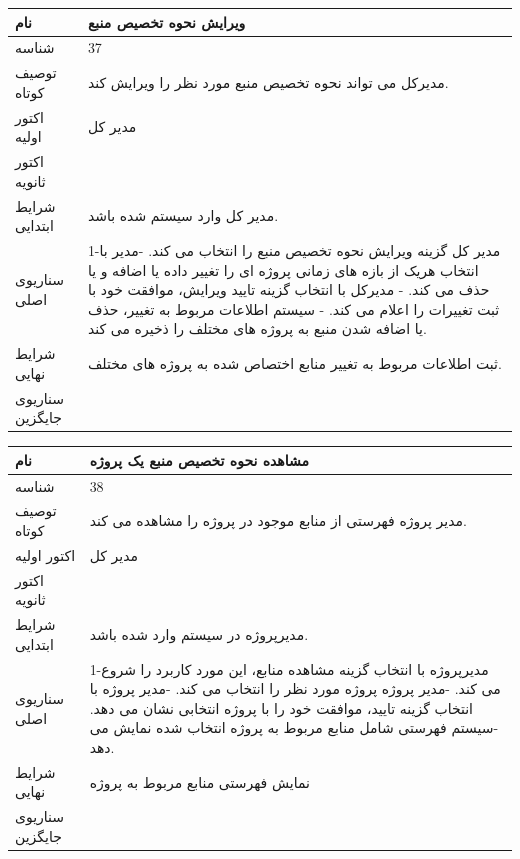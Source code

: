 \vspace{2cm}

\begin{tabular}{|p{2cm}|p{10cm}|}
\hline
نام
&
ویرایش نحوه تخصیص منبع
\\
\hline
شناسه
&
37
\\
\hline
توصیف کوتاه
&
مدیرکل می تواند نحوه تخصیص منبع مورد نظر را ویرایش کند. 
\\
\hline
اکتور اولیه
&
مدیر کل
\\
\hline
اکتور ثانویه
&

\\
\hline
شرایط ابتدایی
&
مدیر کل وارد سیستم شده باشد.
\\
\hline
سناریوی اصلی
&
1-مدیر کل گزینه ویرایش نحوه تخصیص منبع را انتخاب می کند.
\newline
2-مدیر با انتخاب هریک از بازه های زمانی پروژه ای را تغییر داده یا اضافه و یا حذف می کند.
\newline
3- مدیرکل با انتخاب گزینه تایید ویرایش، موافقت خود با ثبت تغییرات را اعلام می کند.
\newline
4- سیستم اطلاعات مربوط به تغییر، حذف یا اضافه شدن منبع به پروژه های مختلف را ذخیره می کند.  
\\
\hline
شرایط نهایی
&
ثبت اطلاعات مربوط به تغییر منابع اختصاص شده به پروژه های مختلف.
\\
\hline
سناریوی جایگزین
&

\\
\hline
\end{tabular}

\vspace{2cm}

\begin{tabular}{|p{2cm}|p{10cm}|}
\hline
نام
&
مشاهده نحوه تخصیص منبع یک پروژه
\\
\hline
شناسه
&
38
\\
\hline
توصیف کوتاه
&
مدیر پروژه فهرستی از منابع موجود در پروژه را مشاهده می کند.
\\
\hline
اکتور اولیه
&
مدیر کل
\\
\hline
اکتور ثانویه
&

\\
\hline
شرایط ابتدایی
&
مدیرپروژه در سیستم وارد شده باشد.
\\
\hline
سناریوی اصلی
&
1-مدیرپروژه با انتخاب گزینه مشاهده منابع، این مورد کاربرد را شروع می کند.
\newline
2-مدیر پروژه پروژه مورد نظر را انتخاب می کند.
\newline
3-مدیر پروژه با انتخاب گزینه تایید، موافقت خود را با پروژه انتخابی نشان می دهد.
\newline
4-سیستم فهرستی شامل منابع مربوط به پروژه انتخاب شده نمایش می دهد.
\\
\hline
شرایط نهایی
&
نمایش فهرستی منابع مربوط به پروژه
\\
\hline
سناریوی جایگزین
&

\\
\hline
\end{tabular}

